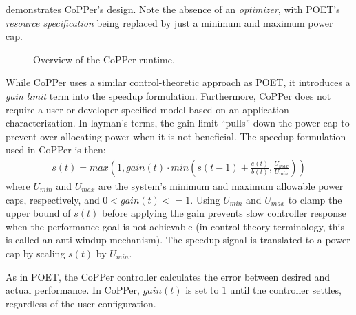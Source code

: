  demonstrates CoPPer's design.
Note the absence of an \emph{optimizer}, with POET's \emph{resource specification} being replaced by just a minimum and maximum power cap.

\begin{figure}[t]
  \begin{centering}
    
    \caption{Overview of the CoPPer runtime.}
    \label{fig:copper-runtime}
  \end{centering}
\end{figure}

While CoPPer uses a similar control-theoretic approach as POET, it introduces a \emph{gain limit} term into the speedup formulation.
Furthermore, CoPPer does not require a user or developer-specified model based on an application characterization.
In layman's terms, the gain limit ``pulls'' down the power cap to prevent over-allocating power when it is not beneficial.
The speedup formulation used in CoPPer is then:
\begin{eqnarray}
  s(t) = max\left(1, gain(t) \cdot min\left(s(t-1) + \frac{e(t)}{b(t)}, \frac{U_{max}}{U_{min}}\right)\right)
  \label{eqn:copper-speedup-control}
\end{eqnarray}
where $U_{min}$ and $U_{max}$ are the system's minimum and maximum allowable power caps, respectively, and $0 < gain(t) <= 1$.
Using $U_{min}$ and $U_{max}$ to clamp the upper bound of $s(t)$ before applying the gain prevents slow controller response when the performance goal is not achievable (in control theory terminology, this is called an anti-windup mechanism).
The speedup signal is translated to a power cap by scaling $s(t)$ by $U_{min}$.

As in POET, the CoPPer controller calculates the error between desired and actual performance.
In CoPPer, $gain(t)$ is set to $1$ until the controller settles, regardless of the user configuration.


